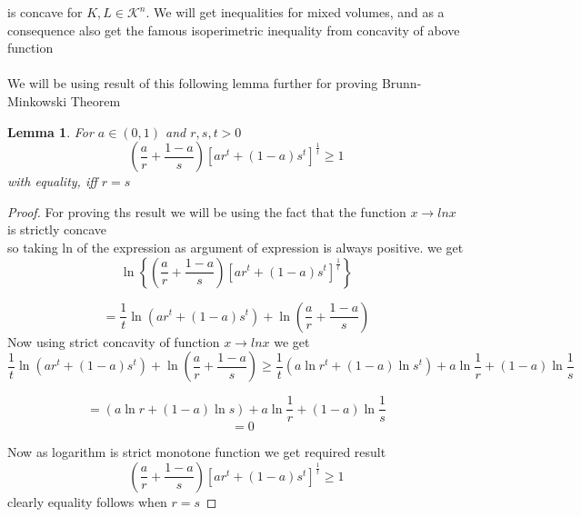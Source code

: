 \documentclass[oneside]{book}
\newtheorem{lemma}[theorem]{Lemma}
\begin{document}
 is concave for $ K, L \in \mathcal{K}^n $.
We will get inequalities for mixed volumes, and as a consequence also get the famous isoperimetric inequality from concavity of above function
\\\\
We will be using result of this following lemma further for proving Brunn-Minkowski Theorem
\begin{lemma} 
\label{l:1}
For $a \in(0,1)$ and $r, s, t>0$
\[
\left(\frac{a}{r}+\frac{1-a}{s}\right)\left[a r^{t}+(1-a) s^{t}\right]^{\frac{1}{t}} \geq 1
\]
with equality, iff $r=s$
\end{lemma} 
 \begin{proof}
 
 For proving ths result we will be using the fact that the function $x \rightarrow lnx $ is strictly concave \\
 so taking ln of the expression as argument of expression is always positive. we get 
 $$\ln \left\{\left(\frac{a}{r}+\frac{1-a}{s}\right)\left[a r^{t}+(1-a) s^{t}\right]^{\frac{1}{t}}\right\}$$
 
$$ =\frac{1}{t} \ln \left(a r^{t}+(1-a) s^{t}\right)+\ln \left(\frac{a}{r}+\frac{1-a}{s}\right)$$
Now using strict concavity of  function  $x \rightarrow lnx $ we get 
$$\frac{1}{t} \ln \left(a r^{t}+(1-a) s^{t}\right)+\ln \left(\frac{a}{r}+\frac{1-a}{s}\right)
  \geq \frac{1}{t}\left(a \ln r^{t}+(1-a) \ln s^{t}\right)+a \ln \frac{1}{r}+(1-a) \ln \frac{1}{s}$$
  
  
$$ =  \left(a \ln r+(1-a) \ln s\right)+a \ln \frac{1}{r}+(1-a) \ln \frac{1}{s}$$
$$\quad = 0$$
 
 Now as logarithm is strict monotone function we get required result 
 \[
\left(\frac{a}{r}+\frac{1-a}{s}\right)\left[a r^{t}+(1-a) s^{t}\right]^{\frac{1}{t}} \geq 1
\]
 clearly equality follows when $r = s $
 \end{proof}
 
 
 
 
 
 

 
 
\end{document}
